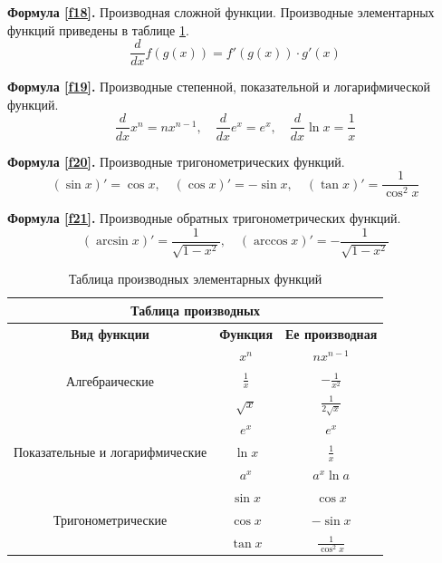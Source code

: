 \documentclass[a4paper,12pt]{article}
\begin{document}
\vspace{15pt}
\textbf{Формула \ref{f18}.}
Производная сложной функции. Производные элементарных функций приведены в таблице \ref{tab:1}.
\begin{equation}
\frac{d}{dx}f(g(x))=f'(g(x))\cdot g'(x)
\label{f18}
\end{equation}


\vspace{15pt}
\textbf{Формула \ref{f19}.}
Производные степенной, показательной и логарифмической функций.
\begin{equation}
\frac{d}{dx}x^n=nx^{n-1}, \quad \frac{d}{dx}e^x=e^x, \quad \frac{d}{dx}\ln x=\frac{1}{x}
\label{f19}
\end{equation}


\vspace{15pt}
\textbf{Формула \ref{f20}.}
Производные тригонометрических функций.
\begin{equation}
(\sin x)'=\cos x, \quad (\cos x)'=-\sin x, \quad (\tan x)'=\frac{1}{\cos^2 x}
\label{f20}
\end{equation}


\vspace{15pt}
\textbf{Формула \ref{f21}.}
Производные обратных тригонометрических функций.
\begin{equation}
(\arcsin x)'=\frac{1}{\sqrt{1-x^2}}, \quad (\arccos x)'=-\frac{1}{\sqrt{1-x^2}}
\label{f21}
\end{equation}


\begin{table}[!h]
\centering
\caption{Таблица производных элементарных функций}
\label{tab:1}
\vspace{15pt}
\begin{tabular}{|c|c|c|}
\hline
\multicolumn{3}{|c|}{Таблица производных} \\
\hline
\textbf{Вид функции} & \textbf{Функция} & \textbf{Ее производная} \\
\hline
\multirow{3}{*}{Алгебраические} 
& $x^n$ & $nx^{n-1}$ \\ \cline{2-3}
& $\frac{1}{x}$ & $-\frac{1}{x^2}$ \\ \cline{2-3}
& $\sqrt{x}$ & $\frac{1}{2\sqrt{x}}$ \\
\hline
\multirow{3}{*}{Показательные и логарифмические}
& $e^x$ & $e^x$ \\ \cline{2-3}
& $\ln x$ & $\frac{1}{x}$ \\ \cline{2-3}
& $a^x$ & $a^x \ln a$ \\
\hline
\multirow{3}{*}{Тригонометрические}
& $\sin x$ & $\cos x$ \\ \cline{2-3}
& $\cos x$ & $-\sin x$ \\ \cline{2-3}
& $\tan x$ & $\frac{1}{\cos^2 x}$ \\
\hline
\end{tabular}
\end{table}
\end{document}
